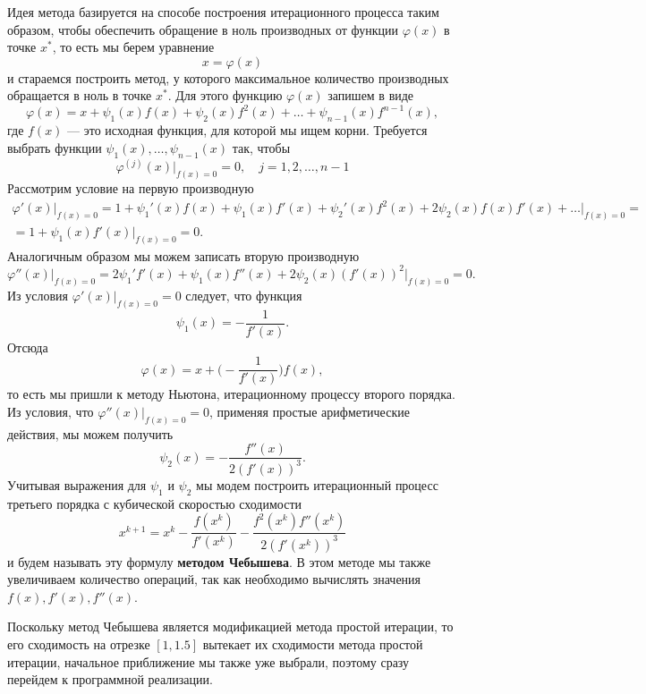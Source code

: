 \documentclass[11pt]{article}
\begin{document}
Идея метода базируется на способе построения итерационного процесса
таким образом, чтобы обеспечить обращение в ноль производных от функции
\(\varphi(x)\) в точке \(x^*\), то есть мы берем уравнение
\[x = \varphi(x)\] и стараемся построить метод, у которого максимальное
количество производных обращается в ноль в точке \(x^*\). Для этого
функцию \(\varphi(x)\) запишем в виде
\[\varphi(x) = x+ \psi_1(x) f(x) + \psi_2(x)f^2(x) + \ldots + \psi_{n-1}(x)f^{n-1}(x),\]
где \(f(x)\) --- это исходная функция, для которой мы ищем корни.
Требуется выбрать функции \(\psi_1(x),\ldots, \psi_{n-1}(x)\) так, чтобы
\[\varphi^{(j)}(x)\Big|_{f(x)=0} = 0,\quad j=1,2,\ldots,n-1 \]
Рассмотрим условие на первую производную \begin{multline*}
    \varphi'(x)\Big|_{f(x) = 0} = 1 + \psi_1'(x)f(x) + \psi_1(x) f'(x) + \psi_2'(x) f^2(x) + 2\psi_2(x) f(x) f'(x) + \ldots \Big|_{f(x) = 0}=\\=1 + \psi_1(x) f'(x) \Big|_{f(x) = 0} = 0.
\end{multline*} Аналогичным образом мы можем записать вторую производную
\[\varphi''(x)\Big|_{f(x) = 0} = 2\psi_1' f'(x) + \psi_1(x) f''(x) + 2\psi_2(x) (f'(x))^2 \Big|_{f(x) = 0} = 0.\]
Из условия \(\varphi'(x)\Big|_{f(x) = 0}=0\) следует, что функция
\[\psi_1(x) = -\dfrac{1}{f'(x)}.\] Отсюда
\[\varphi(x) = x + \Big(-\dfrac{1}{f'(x)}\Big)f(x),\] то есть мы пришли
к методу Ньютона, итерационному процессу второго порядка. Из условия,
что \(\varphi''(x)\Big|_{f(x) = 0}=0\), применяя простые арифметические
действия, мы можем получить \[\psi_2(x) = -\dfrac{f''(x)}{2(f'(x))^3}.\]
Учитывая выражения для \(\psi_1\) и \(\psi_2\) мы модем построить
итерационный процесс третьего порядка с кубической скоростью сходимости
\[x^{k+1} = x^k - \dfrac{f(x^k)}{f'(x^k)} - \dfrac{f^2(x^k)f''(x^k)}{2(f'(x^k))^3}\]
и будем называть эту формулу \textbf{методом Чебышева}. В этом методе мы
также увеличиваем количество операций, так как необходимо вычислять
значения \(f(x), f'(x), f''(x)\).

Поскольку метод Чебышева является модификацией метода простой итерации,
то его сходимость на отрезке \([1, 1.5]\) вытекает их сходимости метода
простой итерации, начальное приближение мы также уже выбрали, поэтому
сразу перейдем к программной реализации.
\end{document}
